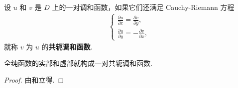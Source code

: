 \documentclass[../../main.tex]{subfiles}
\begin{document}
\begin{definition}[共轭调和函数]
设 $u$ 和 $v$ 是 $D$ 上的一对调和函数，如果它们还满足 Cauchy-Riemann 方程
\begin{align}
\begin{cases} 
\displaystyle \frac{\partial u}{\partial x} = \frac{\partial v}{\partial y}, \\
\displaystyle \frac{\partial u}{\partial y} = -\frac{\partial v}{\partial x},
\end{cases} \label{eq:2.2.10}
\end{align}
就称 $v$ 为 $u$ 的\textbf{共轭调和函数}.
\end{definition}

\begin{proposition}
全纯函数的实部和虚部就构成一对共轭调和函数.
\end{proposition}
\begin{proof}
由和立得.
\end{proof}
\end{document}
